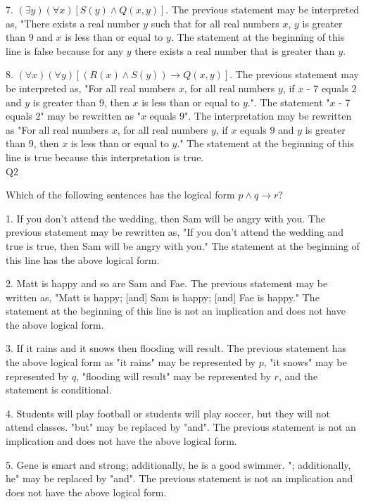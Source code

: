 \documentclass{article}
\begin{document}
7. \((\exists y) (\forall x) [S(y) \land Q(x, y)]\). The previous statement may be interpreted as, "There exists a real number \(y\) such that for all real numbers \(x\), \(y\) is greater than \(9\) and \(x\) is less than or equal to \(y\). The statement at the beginning of this line is false because for any \(y\) there exists a real number that is greater than \(y\).

8. \((\forall x) (\forall y) [(R(x) \land S(y)) \rightarrow Q(x, y)]\). The previous statement may be interpreted as, "For all real numbers \(x\), for all real numbers \(y\), if \(x\) - 7 equals \(2\) and \(y\) is greater than \(9\), then \(x\) is less than or equal to \(y\).". The statement "\(x\) - 7 equals \(2\)" may be rewritten as "\(x\) equals \(9\)". The interpretation may be rewritten as "For all real numbers \(x\), for all real numbers \(y\), if \(x\) equals \(9\) and \(y\) is greater than \(9\), then \(x\) is less than or equal to \(y\)." The statement at the beginning of this line is true because this interpretation is true.\\

Q2

Which of the following sentences has the logical form \(p \land q \rightarrow r\)?

1. If you don't attend the wedding, then Sam will be angry with you. The previous statement may be rewritten as, "If you don't attend the wedding and true is true, then Sam will be angry with you." The statement at the beginning of this line has the above logical form.

2. Matt is happy and so are Sam and Fae. The previous statement may be written as, "Matt is happy; [and] Sam is happy; [and] Fae is happy." The statement at the beginning of this line is not an implication and does not have the above logical form.

3. If it rains and it snows then flooding will result. The previous statement has the above logical form as "it rains" may be represented by \(p\), "it snows" may be represented by \(q\), "flooding will result" may be represented by \(r\), and the statement is conditional.

4. Students will play football or students will play soccer, but they will not attend classes. "but" may be replaced by "and". The previous statement is not an implication and does not have the above logical form.

5. Gene is smart and strong; additionally, he is a good swimmer. "; additionally, he" may be replaced by "and". The previous statement is not an implication and does not have the above logical form.\\
\end{document}
